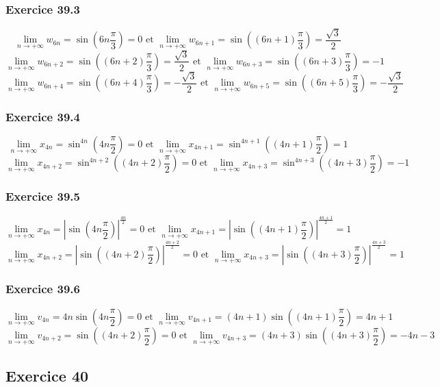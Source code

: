 \documentclass[]{book}
\theoremstyle{definition}
\begin{document}
\subsubsection*{Exercice 39.3}
$$\lim_{n \to +\infty}{w_{6n}} = \sin(6n\frac{\pi}{3}) = 0 \textrm{  et    } \lim_{n \to +\infty}{w_{6n+1}} = \sin((6n+1)\frac{\pi}{3}) = \frac{\sqrt{3}}{2}$$
$$\lim_{n \to +\infty}{w_{6n+2}} = \sin((6n+2)\frac{\pi}{3}) = \frac{\sqrt{3}}{2} \textrm{  et    } \lim_{n \to +\infty}{w_{6n+3}} = \sin((6n+3)\frac{\pi}{3}) = -1$$
$$\lim_{n \to +\infty}{w_{6n+4}} = \sin((6n+4)\frac{\pi}{3}) = -\frac{\sqrt{3}}{2} \textrm{  et    } \lim_{n \to +\infty}{w_{6n+5}} = \sin((6n+5)\frac{\pi}{3}) = -\frac{\sqrt{3}}{2}$$

\subsubsection*{Exercice 39.4}
$$\lim_{n \to +\infty}{x_{4n}} = \sin^{4n}(4n\frac{\pi}{2}) = 0 \textrm{  et    } \lim_{n \to +\infty}{x_{4n+1}} = \sin^{4n+1}((4n+1)\frac{\pi}{2}) = 1$$
$$\lim_{n \to +\infty}{x_{4n+2}} = \sin^{4n+2}((4n+2)\frac{\pi}{2}) = 0 \textrm{  et    } \lim_{n \to +\infty}{x_{4n+3}} = \sin^{4n+3}((4n+3)\frac{\pi}{2}) = -1$$

\subsubsection*{Exercice 39.5}
$$\lim_{n \to +\infty}{x_{4n}} = |\sin(4n\frac{\pi}{2})|^{\frac{4n}{2}} = 0 \textrm{  et    } \lim_{n \to +\infty}{x_{4n+1}} = |\sin((4n+1)\frac{\pi}{2})|^{\frac{4n+1}{2}} = 1$$
$$\lim_{n \to +\infty}{x_{4n+2}} = |\sin((4n+2)\frac{\pi}{2})|^{\frac{4n+2}{2}} = 0 \textrm{  et  } \lim_{n \to +\infty}{x_{4n+3}} = |\sin((4n+3)\frac{\pi}{2})|^{\frac{4n+3}{2}} = 1$$

\subsubsection*{Exercice 39.6}
$$\lim_{n \to +\infty}{v_{4n}} = 4n\sin(4n\frac{\pi}{2}) = 0 \textrm{  et    } \lim_{n \to +\infty}{v_{4n+1}} = (4n+1)\sin((4n+1)\frac{\pi}{2}) = 4n+1$$
$$\lim_{n \to +\infty}{v_{4n+2}} = \sin((4n+2)\frac{\pi}{2}) = 0 \textrm{  et    } \lim_{n \to +\infty}{v_{4n+3}} = (4n+3)\sin((4n+3)\frac{\pi}{2}) = -4n-3$$

\subsection*{Exercice 40}
\end{document}
